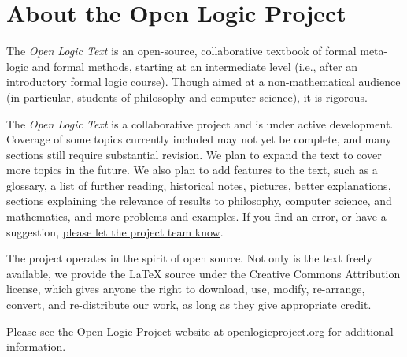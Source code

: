 \chapter*{About the Open Logic Project}

The \textit{Open Logic Text} is an open-source, collaborative textbook
of formal meta-logic and formal methods, starting at an intermediate level
(i.e., after an introductory formal logic course). Though aimed at a
non-mathematical audience (in particular, students of philosophy and
computer science), it is rigorous.

The \textit{Open Logic Text} is a collaborative project and is under
active development. Coverage of some topics currently included may
not yet be complete, and many sections still require substantial
revision. We plan to expand the text to cover more topics in
the future. We also plan to add features to the text, such as a
glossary, a list of further reading, historical notes, pictures, better
explanations, sections explaining the relevance of results to
philosophy, computer science, and mathematics, and more problems and
examples. If you find an error, or have a suggestion,
\href{https://github.com/OpenLogicProject/OpenLogic/wiki/Contributing}{please
  let the project team know}.

The project operates in the spirit of open source. Not only is the
text freely available, we provide the LaTeX source under the
Creative Commons Attribution license, which gives anyone the right to
download, use, modify, re-arrange, convert, and re-distribute our
work, as long as they give appropriate credit.

Please see the Open Logic Project website at
\href{http://openlogicproject.org/}{openlogicproject.org} for
additional information.
